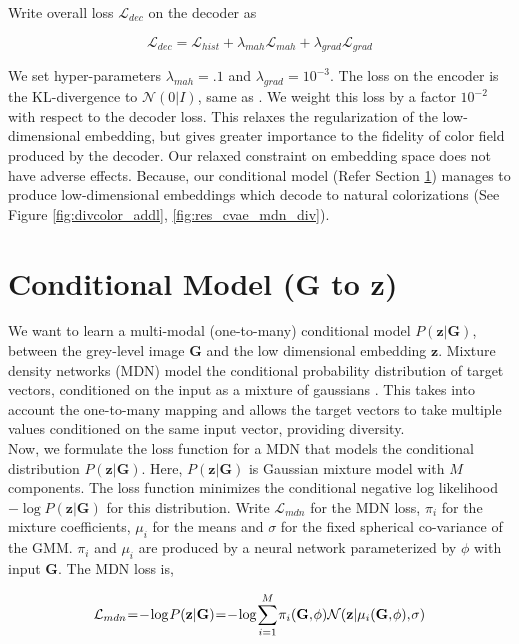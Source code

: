 \documentclass[10pt,twocolumn,letterpaper]{article}
\begin{document}
Write overall loss $\mathcal{L}_{dec}$ on the decoder as

\begin{equation}
\label{eq:vae_loss_all}
\mathcal{L}_{dec} = \mathcal{L}_{hist} + \lambda_{mah} \mathcal{L}_{mah} + \lambda_{grad} \mathcal{L}_{grad}
\end{equation}

We set hyper-parameters $\lambda_{mah} = .1$ and $\lambda_{grad} = 10^{-3}$. 
The loss on the encoder is the KL-divergence to $\mathcal{N}(0|I)$, same as \cite{AEB}. We
weight this loss by a factor $10^{-2}$ with respect to the decoder loss. This 
relaxes the regularization of the low-dimensional embedding, but gives
greater importance to the fidelity of color field produced by the decoder. 
Our relaxed constraint on embedding space does not have adverse effects.
Because, our conditional model (Refer Section \ref{sec:mdn}) manages to produce 
low-dimensional embeddings which decode to natural colorizations 
(See Figure \ref{fig:divcolor_addl}, \ref{fig:res_cvae_mdn_div}).

\section{Conditional Model (G to z)}\label{sec:mdn}We want to learn a multi-modal (one-to-many) conditional model $P(\mathbf{z}|\mathbf{G})$, 
between the grey-level image $\mathbf{G}$ and the low dimensional embedding $\mathbf{z}$.
Mixture density networks (MDN) model the conditional probability distribution of 
target vectors, conditioned on the input as a mixture of gaussians \cite{BishopMDN}.
This takes into account the one-to-many mapping and allows the target vectors to take 
multiple values conditioned on the same input vector, providing diversity. \\ 

Now, we formulate the loss function for a MDN that models the conditional 
distribution $P(\mathbf{z}|\mathbf{G})$. Here, $P(\mathbf{z}|\mathbf{G})$ is 
Gaussian mixture model with $M$ components. The loss function minimizes the 
conditional negative log likelihood $-\log P(\mathbf{z}|\mathbf{G})$ for
this distribution. Write $\mathcal{L}_{mdn}$ for the MDN loss, $\pi_i$ for the 
mixture coefficients, $\mu_{i}$ for the means and $\sigma$ for the fixed 
spherical co-variance of the GMM. $\pi_i$ and $\mu_i$ are produced 
by a neural network parameterized by $\phi$ with input $\mathbf{G}$. The
MDN loss is, 

\begin{equation}
\label{eq:loss_mdn}
\medmuskip=1mu
\thinmuskip=1mu
\thickmuskip=1mu
\mathcal{L}_{mdn} = - \log P(\mathbf{z} | \mathbf{G}) = - \log \sum\limits_{i=1}^{M} 
\pi_{i}(\mathbf{G}, \phi) \mathcal{N}(\mathbf{z} | \mu_i(\mathbf{G}, \phi), \sigma)  
\end{equation}
\end{document}
